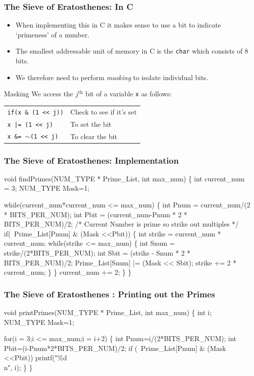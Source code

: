 \documentclass[table]{beamer}
\newif\ifschigh\schighfalse
\newcommand{\kw}[1]{\ifschigh\textcolor{red}{#1}\else\textcolor{keyword}{#1}\fi}
\newcommand{\kt}[1]{\ifschigh\textcolor{red}{#1}\else\textcolor{ctext}{#1}\fi}
\newcommand{\kc}[1]{\ifschigh\textcolor{red}{#1}\else\textcolor{comment}{#1}\fi}
\newcounter{sckll}
\newcommand{\kr}{\setcounter{sckll}{1}}
\newcommand{\kl}{}
\begin{document}
\begin{frame}
\frametitle{The Sieve of Eratosthenes: In C}
\begin{itemize}
\item When implementing this in C it makes sense to use a bit to indicate `primeness' of a number.
\item The smallest addressable unit of memory in C is the {\tt \kw{char}} which consists of 8 bits.
\item We therefore need to perform \emph{masking} to isolate individual bits.
\end{itemize}
\begin{block}{Masking}
We access the $j^\mathrm{th}$ bit of a variable {\tt x} as follows:
\begin{center}
\begin{tabular}{l l}
\tt \kw{if}(x \& (1 << j))&Check to see if it's set\\
\tt x |= (1 << j)& To set the bit\\
\tt x \&= $\sim$(1 << j)&To clear the bit
\end{tabular}
\end{center}
\end{block}
\end{frame}

\begin{frame}[fragile]
\frametitle{The Sieve of Eratosthenes: Implementation}
\vspace{-0.2in}
\begin{semiverbatim}
\scriptsize
\kr\kl\kw{void} findPrimes(NUM_TYPE * Prime_List, \kw{int} max_num)
\kl\{
\kl   \kw{int} current_num = 3;
\kl   NUM_TYPE Mask=1;
\kl
\kl   \kw{while}(current_num*current_num <= max_num)
\kl   \{
\kl      \kw{int} Pnum = current_num/(2 * BITS_PER_NUM);
\kl      \kw{int} Pbit = (current_num-Pnum * 2 * BITS_PER_NUM)/2;
\kl      \kc{/* Current Number is prime so strike out multiples */}
\kl      \kw{if}(~Prime_List[Pnum] & (Mask <<Pbit))
\kl      \{
\kl         \kw{int} strike = current_num * current_num;
\kl         \kw{while}(strike <= max_num)
\kl         \{
\kl            \kw{int} Snum = strike/(2*BITS_PER_NUM);
\kl            \kw{int} Sbit = (strike - Snum * 2 * BITS_PER_NUM)/2;
\kl            Prime_List[Snum] |= (Mask << Sbit);
\kl            strike += 2 * current_num;
\kl         \}                       
\kl      \}
\kl      current_num += 2;
\kl   \}
\kl\}
\end{semiverbatim}
\end{frame}

\begin{frame}[fragile]
\frametitle{The Sieve of Eratosthenes : Printing out the Primes}
\begin{semiverbatim}
\small
\kr\kl\kw{void} printPrimes(NUM_TYPE * Prime_List, \kw{int} max_num)
\kl\{
\kl   \kw{int} i;
\kl   NUM_TYPE Mask=1;
\kl
\kl   \kw{for}(i = 3;i <= max_num;i = i+2)
\kl   \{
\kl      \kw{int} Pnum=i/(2*BITS_PER_NUM);
\kl      \kw{int} Pbit=(i-Pnum*2*BITS_PER_NUM)/2;
\kl      \kw{if} (~Prime_List[Pnum] & (Mask <<Pbit))
\kl         printf(\kt{"\%d\\n"}, i);
\kl   \}
\kl\}
\end{semiverbatim}
\end{frame}
\end{document}
